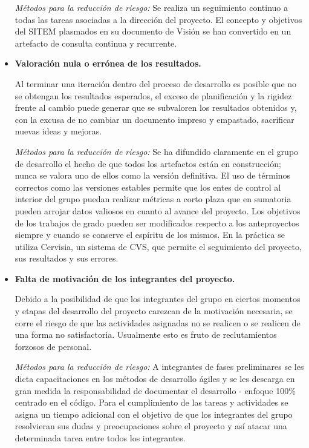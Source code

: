 \begin{itemize}
\textit{Métodos para la reducción de riesgo:}  Se realiza un seguimiento continuo a todas las tareas asociadas a la dirección del proyecto. El concepto y objetivos del SITEM plasmados en su documento de Visión se han convertido en un artefacto de consulta continua y recurrente.

\item \textbf{Valoración nula o errónea de los resultados.} 

Al terminar una iteración dentro del proceso de desarrollo es posible que no se obtengan los resultados esperados, el exceso de planificación y la rigidez frente al cambio puede generar que se subvaloren los resultados obtenidos y, con la excusa de no cambiar un documento impreso y empastado, sacrificar nuevas ideas y mejoras.

\textit{Métodos para la reducción de riesgo:} Se ha difundido claramente en el grupo de desarrollo el hecho de que todos los artefactos están en construcción; nunca se valora uno de ellos como la versión definitiva. El uso de términos correctos como las versiones estables permite que los entes de control al interior del grupo puedan realizar métricas a corto plaza que en sumatoria pueden arrojar datos valiosos en cuanto al avance del proyecto. Los objetivos de los trabajos de grado pueden ser modificados respecto a los anteproyectos siempre y cuando se conserve el espíritu de los mismos. En la práctica se utiliza Cervisia, un sistema de CVS, que permite el seguimiento del proyecto, sus resultados y sus errores.

\item \textbf{Falta de motivación de los integrantes del proyecto.} 

Debido a la posibilidad de que los integrantes del grupo en ciertos momentos y etapas del desarrollo del proyecto carezcan de la motivación necesaria, se corre el riesgo de que las actividades asignadas no se realicen o se realicen de una forma no satisfactoria. Usualmente esto es fruto de reclutamientos forzosos de personal.

\textit{Métodos para la reducción de riesgo:} A integrantes de fases preliminares se les dicta capacitaciones en los métodos de desarrollo ágiles y se les descarga en gran medida la responsabilidad de documentar el desarrollo - enfoque 100\% centrado en el código. Para el cumplimiento de las tareas y actividades se asigna un tiempo adicional con el objetivo de que los integrantes del grupo resolvieran sus dudas y preocupaciones sobre el proyecto y así atacar una determinada tarea entre todos los integrantes.


\end{itemize}
